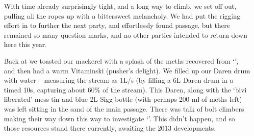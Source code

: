 
With time already surprisingly tight, and a long way to climb, we set
off out, pulling all the ropes up with a bittersweet melancholy. We had
put the rigging effort in to further the next party, and effortlessly
found passage, but there remained so many question marks, and no other
parties intended to return down here this year.

Back at  we toasted our mackerel with a splash of the meths
recovered from `', and then had a warm Vitaminski (pusher's
delight). We filled up our Daren drum with water -- measuring the  stream as 1L/s (by filling a 6L Daren drum in a timed 10s, capturing
about 60\% of the stream). This Daren, along with the `bivi liberated'
mess tin and blue 2L Sigg bottle (with perhaps 200 ml of meths left) was
left sitting in the sand of the main  passage. There was talk of
bolt climbers making their way down this way to investigate `'. This didn't happen, and so those resources stand there
currently, awaiting the 2013 developments.

